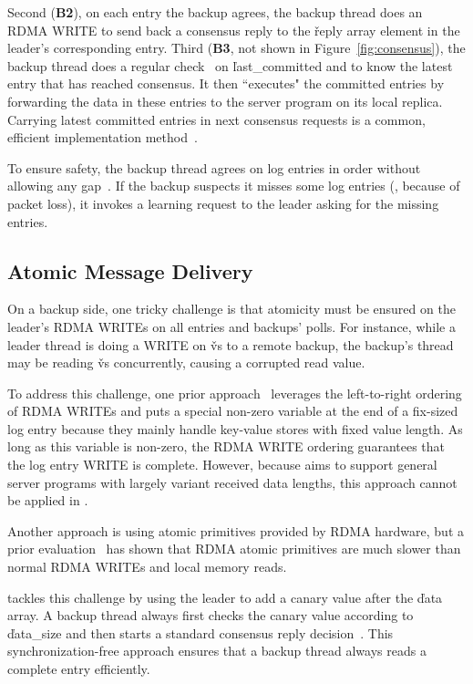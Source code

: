 Second (\textbf{B2}), on each entry the backup agrees, the backup thread does 
an RDMA WRITE to send back a consensus reply to the \v{reply} array element in 
the leader's corresponding entry. Third (\textbf{B3}, not shown 
in Figure~\ref{fig:consensus}), the backup thread does a regular \paxos 
check~\cite{paxos:practical} on \v{last\_committed} and to know the latest 
entry that has reached consensus. It then ``executes" the committed entries by 
forwarding the data in these entries to the server program on its local 
replica. Carrying latest committed entries in next consensus requests is a 
common, efficient \paxos implementation method~\cite{paxos:practical}.

To ensure \paxos safety, the backup thread agrees on log 
entries in order without allowing any gap~\cite{paxos:practical}. If the 
backup suspects it misses some log entries (\eg, because of packet loss),
it invokes a learning request to the leader asking for the 
missing entries.

\subsection{Atomic Message Delivery} \label{sec:atomic}

On a backup side, one tricky challenge is that atomicity must be 
ensured on the leader's RDMA WRITEs on all entries and backups' polls. For 
instance, while a leader thread is doing a WRITE on \v{vs} to a remote backup, 
the backup's thread may be reading \v{vs} concurrently, causing a 
corrupted read value.

To address this challenge, one prior 
approach~\cite{farm:nsdi14,herd:sigcomm14} 
leverages the left-to-right ordering of RDMA WRITEs and puts a special 
non-zero variable at the end of a fix-sized log entry because they mainly 
handle key-value stores with fixed value length. As long as this variable is 
non-zero, the RDMA WRITE ordering guarantees that the log entry WRITE is 
complete. However, because \xxx aims to support general server programs with 
largely variant received data lengths, this approach cannot be applied in \xxx.

Another approach is using atomic primitives provided by RDMA hardware, 
but a prior evaluation~\cite{drtm:sosp15} has shown that RDMA atomic 
primitives are much slower than normal RDMA WRITEs and local memory reads.

\xxx tackles this challenge by using the leader to add a canary value after 
the \v{data} array. A backup thread always first checks the canary value 
according to \v{data\_size} and then starts a standard \paxos consensus 
reply decision~\cite{paxos:practical}. This synchronization-free approach 
ensures that a \xxx backup thread always reads a complete entry efficiently.


